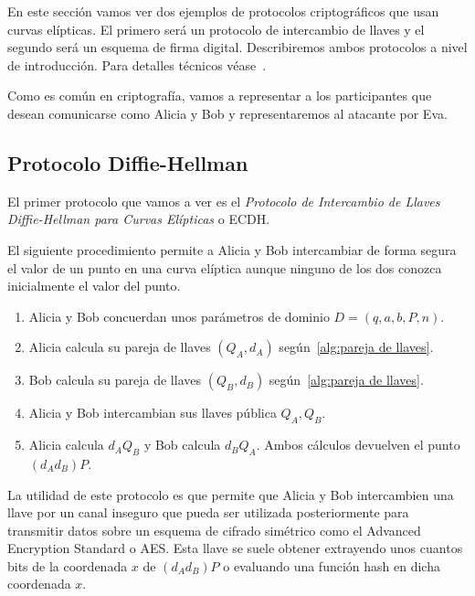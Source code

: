 En este sección vamos ver dos ejemplos de protocolos criptográficos que usan curvas elípticas. El primero será un protocolo de intercambio de llaves y el segundo será un esquema de firma digital. Describiremos ambos protocolos a nivel de introducción. Para detalles técnicos véase~\cite[cap. 4]{Hankerson:2003}.

Como es común en criptografía, vamos a representar a los participantes que desean comunicarse como Alicia y Bob y representaremos al atacante por Eva.

\subsection{Protocolo Diffie-Hellman}
\label{sub:Protocolo Diffie-Hellman}

El primer protocolo que vamos a ver es el \emph{Protocolo de Intercambio de Llaves Diffie-Hellman para Curvas Elípticas} o ECDH.

\begin{protocolo}[ECDH]\label{pc:diffie-hellman}
    El siguiente procedimiento permite a Alicia y Bob intercambiar de forma segura el valor de un punto en una curva elíptica aunque ninguno de los dos conozca inicialmente el valor del punto.

    \begin{enumerate}
        \item Alicia y Bob concuerdan unos parámetros de dominio $D = (q, a, b, P, n)$.
        \item Alicia calcula su pareja de llaves $(Q_A, d_A)$ según~\ref{alg:pareja de llaves}.
        \item Bob calcula su pareja de llaves $(Q_B, d_B)$ según~\ref{alg:pareja de llaves}.
        \item Alicia y Bob intercambian sus llaves pública $Q_A, Q_B$.
        \item Alicia calcula $d_A Q_B$ y Bob calcula $d_B Q_A$. Ambos cálculos devuelven el punto $(d_A d_B) P$.
    \end{enumerate}
\end{protocolo}

La utilidad de este protocolo es que permite que Alicia y Bob intercambien una llave por un canal inseguro que pueda ser utilizada posteriormente para transmitir datos sobre un esquema de cifrado simétrico como el Advanced Encryption Standard o AES. Esta llave se suele obtener extrayendo unos cuantos bits de la coordenada $x$ de $(d_A d_B) P$ o evaluando una función hash en dicha coordenada $x$.

